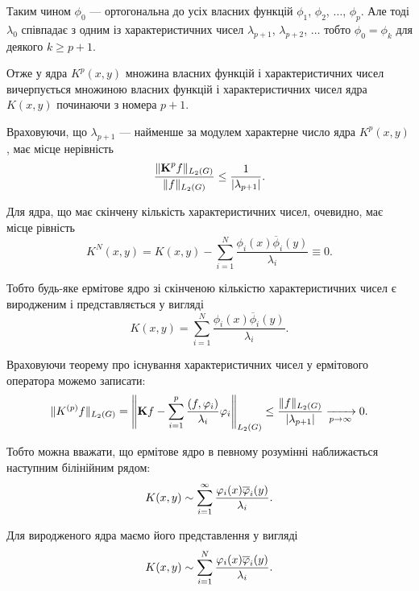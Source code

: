 Таким чином $\phi_0$ --- ортогональна до усіх власних функцій $\phi_1$, $\phi_2$, $\ldots$, $\phi_p$. Але тоді $\lambda_0$ співпадає з одним із характеристичних чисел $\lambda_{p + 1}$, $\lambda_{p + 2}$, $\ldots$ тобто $\phi_0 = \phi_k$ для деякого $k \ge p + 1$. \medskip

Отже у ядра $K^p(x, y)$ множина власних функцій і характеристичних чисел вичерпується множиною власних функцій і характеристичних чисел ядра $K(x, y)$ починаючи з номера $p + 1$. \medskip

Враховуючи, що $\lambda_{p + 1}$ --- найменше за модулем характерне число ядра $K^p(x, y)$, має місце нерівність
\begin{equation}
	\dfrac{\|\bf{K}^p f\|_{L_2(G)}}{\|f\|_{L_2(G)}} \le \dfrac{1}{|\lambda_{p + 1}|}.
\end{equation}

Для ядра, що має скінчену кількість характеристичних чисел, очевидно, має місце рівність
\begin{equation}
	K^N(x, y) = K(x, y) - \sum_{i = 1}^N \frac{\phi_i(x) \overline \phi_i(y)}{\lambda_i} \equiv 0.
\end{equation}

Тобто будь-яке ермітове ядро зі скінченою кількістю характеристичних чисел є виродженим і представляється у вигляді
\begin{equation}
	K(x, y) = \sum_{i = 1}^N \frac{\phi_i(x) \overline \phi_i(y)}{\lambda_i}.
\end{equation}

Враховуючи теорему про існування характеристичних чисел у ермітового оператора можемо записати:
\begin{equation}
	\| K^{(p)} f \|_{L_2(G)} = \left\| \bf{K}f - \Sum_{i = 1}^p \dfrac{(f, \phi_i)}{\lambda_i} \phi_i \right\|_{L_2(G)} \le \dfrac{\|f\|_{L_2(G)}}{|\lambda_{p + 1}|} \xrightarrow[p\to\infty]{} 0.
\end{equation}

Тобто можна вважати, що ермітове ядро в певному розумінні наближається наступним білінійним рядом:
\begin{equation}
	K(x, y) \sim \Sum_{i = 1}^\infty \dfrac{\phi_i(x) \overline \phi_i(y)}{\lambda_i}.
\end{equation}

Для виродженого ядра маємо його представлення у вигляді
\begin{equation}
	K(x, y) \sim \Sum_{i = 1}^N \dfrac{\phi_i(x) \overline \phi_i(y)}{\lambda_i}.
\end{equation}

